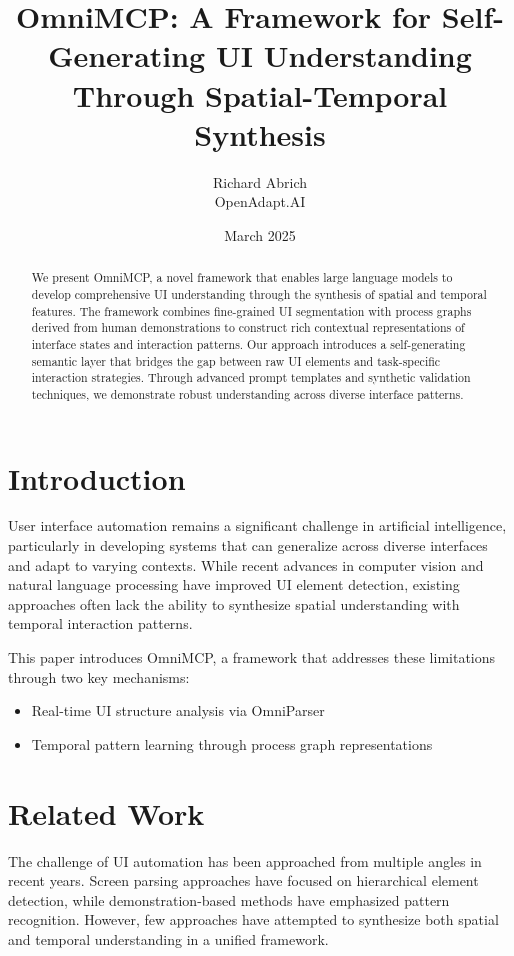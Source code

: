 \documentclass{article}
\title{OmniMCP: A Framework for Self-Generating UI Understanding Through Spatial-Temporal Synthesis}
\author{Richard Abrich \\ OpenAdapt.AI}
\date{March 2025}
\begin{document}
\maketitle

\begin{abstract}
We present OmniMCP, a novel framework that enables large language models to develop comprehensive UI understanding through the synthesis of spatial and temporal features. The framework combines fine-grained UI segmentation with process graphs derived from human demonstrations to construct rich contextual representations of interface states and interaction patterns. Our approach introduces a self-generating semantic layer that bridges the gap between raw UI elements and task-specific interaction strategies. Through advanced prompt templates and synthetic validation techniques, we demonstrate robust understanding across diverse interface patterns.
\end{abstract}

\section{Introduction}
User interface automation remains a significant challenge in artificial intelligence, particularly in developing systems that can generalize across diverse interfaces and adapt to varying contexts. While recent advances in computer vision and natural language processing have improved UI element detection, existing approaches often lack the ability to synthesize spatial understanding with temporal interaction patterns.

This paper introduces OmniMCP, a framework that addresses these limitations through two key mechanisms:
\begin{itemize}
    \item Real-time UI structure analysis via OmniParser
    \item Temporal pattern learning through process graph representations
\end{itemize}

\section{Related Work}
The challenge of UI automation has been approached from multiple angles in recent years. Screen parsing approaches have focused on hierarchical element detection, while demonstration-based methods have emphasized pattern recognition. However, few approaches have attempted to synthesize both spatial and temporal understanding in a unified framework.
\end{document}
